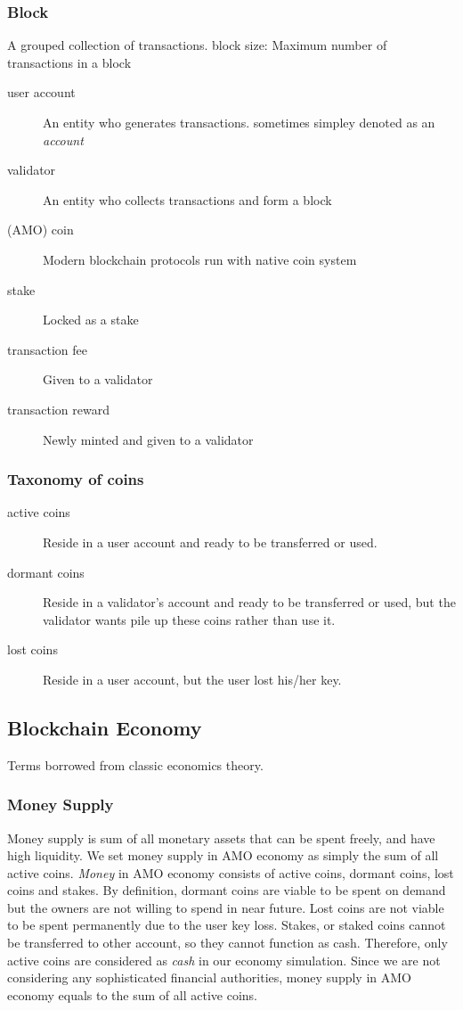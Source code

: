\documentclass[a4paper,11pt]{scrartcl}
\begin{document}
\subsubsection{Block}
A grouped collection of transactions.
block size: Maximum number of transactions in a block

\begin{description}
	\item[user account]
		An entity who generates transactions. sometimes simpley denoted as an
		\emph{account}
	\item[validator]
		An entity who collects transactions and form a block
	\item[(AMO) coin]
		Modern blockchain protocols run with native coin system
	\item[stake]
		Locked as a stake
	\item[transaction fee]
		Given to a validator
	\item[transaction reward]
		Newly minted and given to a validator
\end{description}

\subsubsection{Taxonomy of coins}
\begin{description}
	\item[active coins]
		Reside in a user account and ready to be transferred or used.
	\item[dormant coins]
		Reside in a validator's account and ready to be transferred or used,
		but the validator wants pile up these coins rather than use it.
	\item[lost coins]
		Reside in a user account, but the user lost his/her key.
\end{description}

\subsection{Blockchain Economy}
Terms borrowed from classic economics theory.

\subsubsection{Money Supply}
Money supply is sum of all monetary assets that can be spent freely, and have
high liquidity. We set money supply in AMO economy as simply the sum of all
active coins. \emph{Money} in AMO economy consists of active coins, dormant
coins, lost coins and stakes. By definition, dormant coins are viable to be
spent on demand but the owners are not willing to spend in near future. Lost
coins are not viable to be spent permanently due to the user key loss. Stakes,
or staked coins cannot be transferred to other account, so they cannot function
as cash. Therefore, only active coins are considered as \emph{cash} in our
economy simulation. Since we are not considering any sophisticated financial
authorities, money supply in AMO economy equals to the sum of all active coins.
\end{document}
